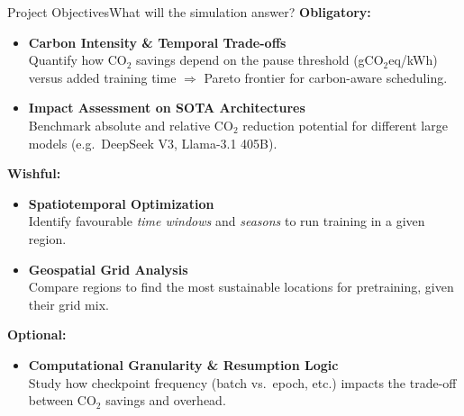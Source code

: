 \begin{frame}[t]{Project Objectives}{What will the simulation answer?}
  \textbf{Obligatory:}
  \begin{itemize}
    \item \textbf{Carbon Intensity \& Temporal Trade-offs}\\
      Quantify how CO$_2$ savings depend on the pause threshold
      (gCO$_2$eq/kWh) versus added training time
      $\Rightarrow$ Pareto frontier for carbon-aware scheduling.
    \item \textbf{Impact Assessment on SOTA Architectures}\\
      Benchmark absolute and relative CO$_2$ reduction potential for
      different large models (e.g.\ DeepSeek V3, Llama-3.1 405B).
  \end{itemize}

  \vspace{0.3cm}
  \textbf{Wishful:}
  \begin{itemize}
    \item \textbf{Spatiotemporal Optimization}\\
      Identify favourable \emph{time windows} and \emph{seasons}
      to run training in a given region.
    \item \textbf{Geospatial Grid Analysis}\\
      Compare regions to find the most sustainable locations
      for pretraining, given their grid mix.
  \end{itemize}

  \vspace{0.3cm}
  \textbf{Optional:}
  \begin{itemize}
    \item \textbf{Computational Granularity \& Resumption Logic}\\
      Study how checkpoint frequency (batch vs.\ epoch, etc.)
      impacts the trade-off between CO$_2$ savings and overhead.
  \end{itemize}

\end{frame}
